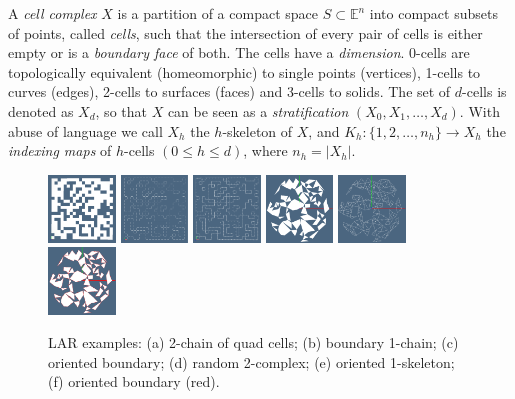 \documentclass[]{egpubl}
\def\E{\mathbb{E}}
\begin{document}
A \emph{cell complex} $X$ is a partition of a compact space $S \subset \E^n$ into compact subsets of points, called \emph{cells}, such that the intersection of every pair of cells is either empty or is a \emph{boundary face} of both. The cells have a \emph{dimension}. 0-cells are topologically equivalent (homeomorphic) to single points (vertices), 1-cells to curves (edges), 2-cells to surfaces (faces) and 3-cells to solids.  The set of $d$-cells is denoted as $X_d$, so that $X$ can be seen as a \emph{stratification} $(X_0, X_1, \ldots, X_d)$. With abuse of language we call $X_h$ the $h$-skeleton of $X$, and $K_h: \{1,2,\ldots,n_h\} \to X_h$ the \emph{indexing maps} of $h$-cells $(0\leq h\leq d)$, where $n_h=|X_h|$. 


\begin{figure}[htbp] %
   \centering
   \includegraphics[height=0.16\textwidth,width=0.16\textwidth]{images/zigzag1} 
   \includegraphics[height=0.16\textwidth,width=0.16\textwidth]{images/zigzag2} 
   \includegraphics[height=0.16\textwidth,width=0.16\textwidth]{images/zigzag3} 
   \includegraphics[height=0.16\textwidth,width=0.16\textwidth]{images/randomdelaunay1} 
   \includegraphics[height=0.16\textwidth,width=0.16\textwidth]{images/randomdelaunay2} 
   \includegraphics[height=0.16\textwidth,width=0.16\textwidth]{images/randomdelaunay3} 
   \caption{LAR examples: (a) 2-chain of quad cells; (b) boundary 1-chain; (c) oriented boundary; (d) random 2-complex; (e) oriented 1-skeleton; (f) oriented boundary (red).}
   \label{fig:meshes}
\end{figure}
\end{document}
